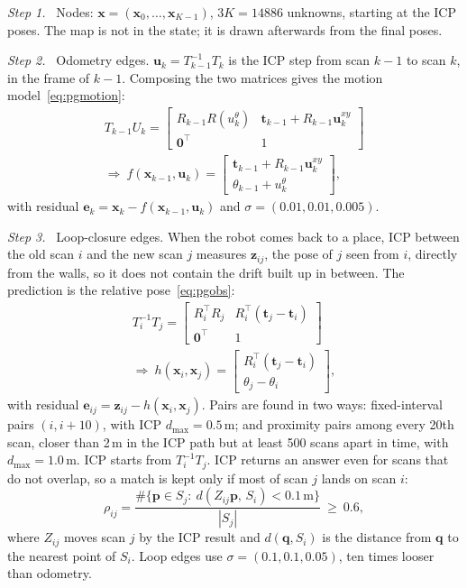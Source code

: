\documentclass[letterpaper, 10pt, conference]{ieeeconf}
\newcommand{\p}{\mathbf{p}}
\newcommand{\q}{\mathbf{q}}
\newcommand{\tb}{\mathbf{t}}
\newcommand{\x}{\mathbf{x}}
\newcommand{\step}[1]{\par\noindent\textit{Step #1.}\ }
\begin{document}
\step{1} Nodes: $\x=(\x_0,\dots,\x_{K-1})$, $3K=14886$ unknowns, starting
at the ICP poses. The map is not in the state; it is drawn afterwards from
the final poses.

\step{2} Odometry edges. $\mathbf{u}_k=T_{k-1}^{-1}T_k$ is the ICP step from
scan $k-1$ to scan $k$, in the frame of $k-1$. Composing the two matrices
gives the motion model~\eqref{eq:pgmotion}:
\begin{equation}
\begin{gathered}
T_{k-1}U_k=\begin{bmatrix}R_{k-1}R(u^\theta_k)&\tb_{k-1}+R_{k-1}\mathbf{u}^{xy}_k\\ \mathbf{0}^\top&1\end{bmatrix}\\
\Rightarrow\ f(\x_{k-1},\mathbf{u}_k)=\begin{bmatrix}\tb_{k-1}+R_{k-1}\mathbf{u}^{xy}_k\\ \theta_{k-1}+u^\theta_k\end{bmatrix},
\end{gathered}
\end{equation}
with residual $\mathbf{e}_k=\x_k-f(\x_{k-1},\mathbf{u}_k)$ and
$\sigma=(0.01,0.01,0.005)$.

\step{3} Loop-closure edges. When the robot comes back to a place, ICP
between the old scan $i$ and the new scan $j$ measures $\mathbf{z}_{ij}$,
the pose of $j$ seen from $i$, directly from the walls, so it does not
contain the drift built up in between. The prediction is the relative
pose~\eqref{eq:pgobs}:
\begin{equation}
\begin{gathered}
T_i^{-1}T_j=\begin{bmatrix}R_i^\top R_j&R_i^\top(\tb_j-\tb_i)\\ \mathbf{0}^\top&1\end{bmatrix}\\
\Rightarrow\ h(\x_i,\x_j)=\begin{bmatrix}R_i^\top(\tb_j-\tb_i)\\ \theta_j-\theta_i\end{bmatrix},
\end{gathered}
\end{equation}
with residual $\mathbf{e}_{ij}=\mathbf{z}_{ij}-h(\x_i,\x_j)$. Pairs are found
in two ways: fixed-interval pairs $(i,i+10)$, with ICP $d_{\max}=0.5$\,m;
and proximity pairs among every 20th scan, closer than 2\,m in the ICP path
but at least 500 scans apart in time, with $d_{\max}=1.0$\,m. ICP starts
from $T_i^{-1}T_j$. ICP returns an answer even for scans that do not
overlap, so a match is kept only if most of scan $j$ lands on scan $i$:
\begin{equation}
\rho_{ij}=\frac{\#\{\p\in S_j:\ d(Z_{ij}\p,\,S_i)<0.1\,\text{m}\}}{|S_j|}\ \ge\ 0.6,
\end{equation}
where $Z_{ij}$ moves scan $j$ by the ICP result and $d(\q,S_i)$ is the
distance from $\q$ to the nearest point of $S_i$. Loop edges use
$\sigma=(0.1,0.1,0.05)$, ten times looser than odometry.
\end{document}
